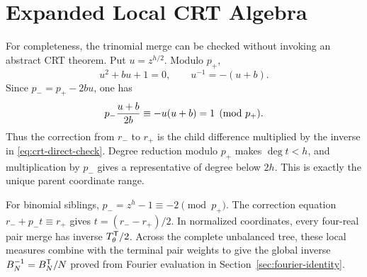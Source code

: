 \section{Expanded Local CRT Algebra}
\label{app:crt}

For completeness, the trinomial merge can be checked without invoking an
abstract CRT theorem.  Put $u=z^{h/2}$.  Modulo $p_+$,
\begin{equation}
 u^2+bu+1=0,\qquad u^{-1}=-(u+b).
 \label{eq:crt-u-inverse}
\end{equation}
Since $p_-=p_+-2bu$, one has
\begin{equation}
 p_-{u+b\over2b}\equiv-u(u+b)=1\pmod{p_+}.
 \label{eq:crt-direct-check}
\end{equation}
Thus the correction from $r_-$ to $r_+$ is the child difference multiplied by
the inverse in \eqref{eq:crt-direct-check}.  Degree reduction modulo $p_+$ makes
$\deg t<h$, and multiplication by $p_-$ gives a representative of degree below
$2h$.  This is exactly the unique parent coordinate range.

For binomial siblings, $p_-=z^h-1\equiv-2\pmod{p_+}$.  The correction equation
$r_-+p_-t\equiv r_+$ gives $t=(r_--r_+)/2$.  In normalized coordinates, every
four-real pair merge has inverse $T_\theta^{\mathsf{T}}/2$.  Across the complete
unbalanced tree, these local measures combine with the terminal pair weights
to give the global inverse $B_N^{-1}=B_N^{\mathsf{T}}/N$ proved from Fourier
evaluation in Section~\ref{sec:fourier-identity}.
